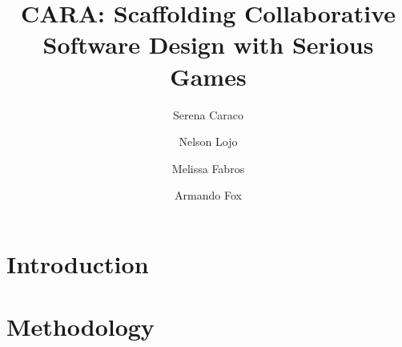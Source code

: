 \documentclass[runningheads]{llncs}
\newcommand{\todo}[1]{\PackageError{TODO}{Unresolved: #1}{}}
\begin{document}
%
\title{CARA: Scaffolding Collaborative Software Design with Serious Games}
%
%
\author{
Serena Caraco \and
Nelson Lojo \and
Melissa Fabros \and
Armando Fox
}
%
%
%
\maketitle              %
%
\begin{abstract}

\end{abstract}
%
%
%
\section{Introduction}


\section{Methodology}



\begin{credits}
\subsubsection{\ackname} \todo{A bold run-in heading in small font size at the end of the paper is used for general acknowledgments, for example: This study was funded by X (grant number Y).}

\subsubsection{\discintname}
\todo{
It is now necessary to declare any competing interests or to specifically
state that the authors have no competing interests. Please place the
statement with a bold run-in heading in small font size beneath the
(optional) acknowledgments\footnote{If EquinOCS, our proceedings submission
system, is used, then the disclaimer can be provided directly in the system.},
for example: The authors have no competing interests to declare that are
relevant to the content of this article. Or: Author A has received research
grants from Company W. Author B has received a speaker honorarium from
Company X and owns stock in Company Y. Author C is a member of committee Z.
}
\end{credits}
%
%
%


%
\end{document}
